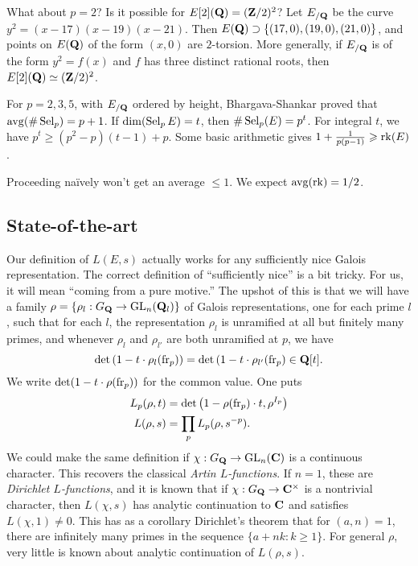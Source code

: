 What about $p=2$? Is it possible for $E[2](\mathbf{Q})=(\mathbf{Z}/2)^2$? Let $E_{/\mathbf{Q}}$ be 
the curve $y^2=(x-17)(x-19)(x-21)$. Then 
$E(\mathbf{Q})\supset \{(17,0),(19,0),(21,0)\}$, and points on 
$E(\mathbf{Q})$ of the form $(x,0)$ are $2$-torsion. More generally, if 
$E_{/\mathbf{Q}}$ is of the form $y^2=f(x)$ and $f$ has three distinct rational roots, 
then $E[2](\mathbf{Q})\simeq (\mathbf{Z}/2)^2$. 

For $p=2,3,5$, with $E_{/\mathbf{Q}}$ ordered by height, Bhargava-Shankar proved that 
$\operatorname{avg}(\#\operatorname{Sel}_p) = p+1$. If 
$\dim(\operatorname{Sel}_pE)=t$, then $\# \operatorname{Sel}_p(E)=p^t$. For integral 
$t$, we have $p^t\geqslant (p^2-p)(t-1)+p$. Some basic arithmetic gives 
$1+\frac{1}{p(p-1)} \geqslant \operatorname{rk}(E)$. 

Proceeding na\"ively won't get an average $\leqslant 1$. 
We expect $\operatorname{avg}(\operatorname{rk} )=1/2$. 





\subsection{State-of-the-art}

Our definition of $L(E,s)$ actually works for any sufficiently nice Galois 
representation. The correct definition of ``sufficiently nice'' is a bit 
tricky. For us, it will mean ``coming from a pure motive.'' The upshot of 
this is that we will have a family $\rho=\{\rho_l:G_{\mathbf{Q}}\to \operatorname{GL}_n(\mathbf{Q}_l)\}$ of 
Galois representations, one for each prime $l$, such that for each $l$, the 
representation $\rho_l$ is unramified at all but finitely many primes, and 
whenever $\rho_l$ and $\rho_{l'}$ are both unramified at $p$, we have 
\[
  \det\left(1-t\cdot \rho_l(\mathrm{fr}_p)\right) = \det\left(1-t\cdot \rho_{l'}(\mathrm{fr}_p\right) \in \mathbf{Q}[t] .
\]
We write $\det(1-t\cdot \rho(\mathrm{fr}_p))$ for the common value. One puts 
\begin{align*}
  L_p(\rho,t) &= \det\left(1-\rho(\mathrm{fr}_p)\cdot t,\rho^{I_p}\right) \\
  L(\rho,s) &= \prod_p L_p(\rho,s^{-p}) .
\end{align*}
We could make the same definition if $\chi:G_{\mathbf{Q}}\to \operatorname{GL}_n(\mathbf{C})$ is a continuous 
character. This recovers the classical \emph{Artin $L$-functions}. If 
$n=1$, these are \emph{Dirichlet $L$-functions}, and it is known that if 
$\chi:G_{\mathbf{Q}}\to \mathbf{C}^\times$ is a nontrivial character, then $L(\chi,s)$ has 
analytic continuation to $\mathbf{C}$ and satisfies $L(\chi,1)\ne 0$. This has as a 
corollary Dirichlet's theorem that for $(a,n)=1$, there are infinitely many 
primes in the sequence $\{a+n k:k\geqslant 1\}$. For general $\rho$, very 
little is known about analytic continuation of $L(\rho,s)$. 

